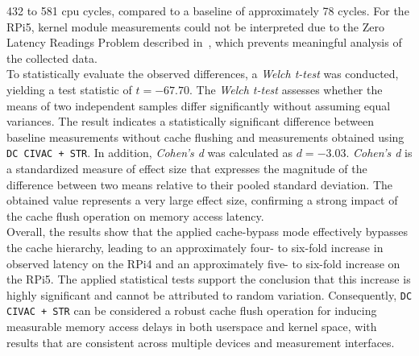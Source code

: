         432 to 581 \gls{cpu} cycles, compared to a baseline of approximately 78 cycles. For the RPi5, kernel module 
        measurements could not be interpreted due to the Zero Latency Readings Problem described in~\cite{paperPraxisarbeit}, 
        which prevents meaningful analysis of the collected data.
        \\
        To statistically evaluate the observed differences, a \textit{Welch t-test} was conducted, yielding a test statistic 
        of \(t = -67.70\). The \textit{Welch t-test} assesses whether the means of two independent samples differ significantly 
        without assuming equal variances. The result indicates a statistically significant difference between baseline 
        measurements without cache flushing and measurements obtained using \texttt{DC CIVAC + STR}. In addition, \textit{Cohen's d} 
        was calculated as \(d = -3.03\). \textit{Cohen's d} is a standardized measure of effect size that expresses the magnitude 
        of the difference between two means relative to their pooled standard deviation. The obtained value represents 
        a very large effect size, confirming a strong impact of the cache flush operation on memory access latency.
        \\
        Overall, the results show that the applied cache-bypass mode effectively bypasses the cache hierarchy, 
        leading to an approximately four- to six-fold increase in observed latency on the RPi4 and an approximately 
        five- to six-fold increase on the RPi5. The applied statistical tests support the conclusion that this 
        increase is highly significant and cannot be attributed to random variation. Consequently, \texttt{DC CIVAC + STR} 
        can be considered a robust cache flush operation for inducing measurable memory access delays in both userspace 
        and kernel space, with results that are consistent across multiple devices and measurement interfaces.

